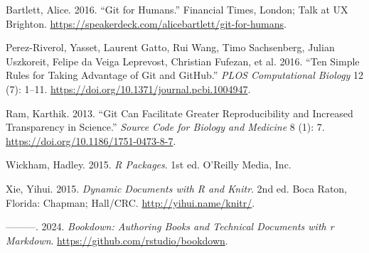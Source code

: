 \documentclass[
]{book}
\newlength{\cslhangindent}
\newenvironment{CSLReferences}[2] %
 {\begin{list}{}{%
  \setlength{\itemindent}{0pt}
  \setlength{\leftmargin}{0pt}
  \setlength{\parsep}{0pt}
  \ifodd #1
   \setlength{\leftmargin}{\cslhangindent}
   \setlength{\itemindent}{-1\cslhangindent}
  \fi
  \setlength{\itemsep}{#2\baselineskip}}}
 {\end{list}}
\begin{document}
\label{refs}
\begin{CSLReferences}{1}{0}
Bartlett, Alice. 2016. {``Git for Humans.''} Financial Times, London; Talk at UX Brighton. \url{https://speakerdeck.com/alicebartlett/git-for-humans}.

Perez-Riverol, Yasset, Laurent Gatto, Rui Wang, Timo Sachsenberg, Julian Uszkoreit, Felipe da Veiga Leprevost, Christian Fufezan, et al. 2016. {``Ten Simple Rules for Taking Advantage of Git and GitHub.''} \emph{PLOS Computational Biology} 12 (7): 1--11. \url{https://doi.org/10.1371/journal.pcbi.1004947}.

Ram, Karthik. 2013. {``Git Can Facilitate Greater Reproducibility and Increased Transparency in Science.''} \emph{Source Code for Biology and Medicine} 8 (1): 7. \url{https://doi.org/10.1186/1751-0473-8-7}.

Wickham, Hadley. 2015. \emph{R Packages}. 1st ed. O'Reilly Media, Inc.

Xie, Yihui. 2015. \emph{Dynamic Documents with {R} and Knitr}. 2nd ed. Boca Raton, Florida: Chapman; Hall/CRC. \url{http://yihui.name/knitr/}.

---------. 2024. \emph{Bookdown: Authoring Books and Technical Documents with r Markdown}. \url{https://github.com/rstudio/bookdown}.

\end{CSLReferences}
\end{document}
